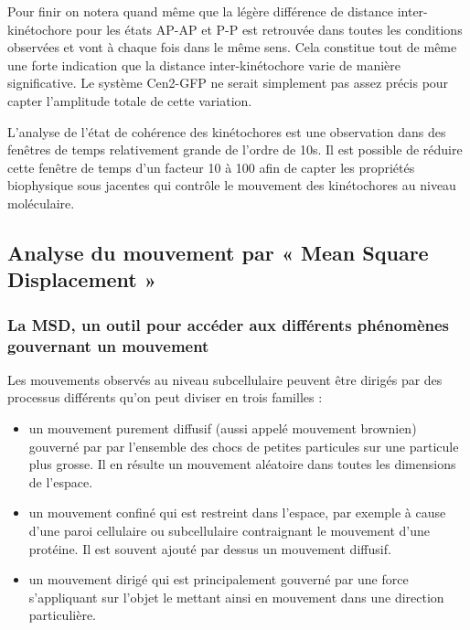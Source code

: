 \documentclass[12pt,a4paper,twoside,openright]{book}
\begin{document}
Pour finir on notera quand même que la légère différence de distance
inter-kinétochore pour les états AP-AP et P-P est retrouvée dans toutes
les conditions observées et vont à chaque fois dans le même sens. Cela
constitue tout de même une forte indication que la distance
inter-kinétochore varie de manière significative. Le système Cen2-GFP ne
serait simplement pas assez précis pour capter l'amplitude totale de
cette variation.

L'analyse de l'état de cohérence des kinétochores est une observation
dans des fenêtres de temps relativement grande de l'ordre de 10s. Il est
possible de réduire cette fenêtre de temps d'un facteur 10 à 100 afin de
capter les propriétés biophysique sous jacentes qui contrôle le
mouvement des kinétochores au niveau moléculaire.

\subsection{Analyse du mouvement par « Mean Square Displacement
»}\label{analyse-du-mouvement-par-mean-square-displacement}

\subsubsection{La MSD, un outil pour accéder aux différents phénomènes
gouvernant un
mouvement}\label{la-msd-un-outil-pour-accuxe9der-aux-diffuxe9rents-phuxe9nomuxe8nes-gouvernant-un-mouvement}

Les mouvements observés au niveau subcellulaire peuvent être dirigés par
des processus différents qu'on peut diviser en trois familles :

\begin{itemize}
\item
  un mouvement purement diffusif (aussi appelé mouvement brownien)
  gouverné par par l'ensemble des chocs de petites particules sur une
  particule plus grosse. Il en résulte un mouvement aléatoire dans
  toutes les dimensions de l'espace.
\item
  un mouvement confiné qui est restreint dans l'espace, par exemple à
  cause d'une paroi cellulaire ou subcellulaire contraignant le
  mouvement d'une protéine. Il est souvent ajouté par dessus un
  mouvement diffusif.
\item
  un mouvement dirigé qui est principalement gouverné par une force
  s'appliquant sur l'objet le mettant ainsi en mouvement dans une
  direction particulière.
\end{itemize}
\end{document}
